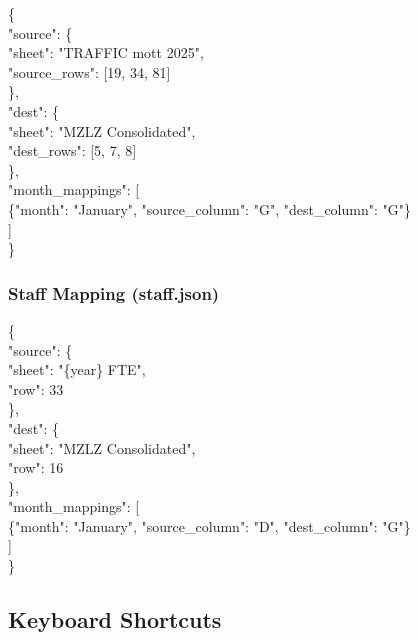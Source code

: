 \documentclass[11pt,a4paper]{article}
\begin{document}
\begin{codebox}
\{\\
\quad "source": \{\\
\quad\quad "sheet": "TRAFFIC mott 2025",\\
\quad\quad "source\_rows": [19, 34, 81]\\
\quad \},\\
\quad "dest": \{\\
\quad\quad "sheet": "MZLZ Consolidated",\\
\quad\quad "dest\_rows": [5, 7, 8]\\
\quad \},\\
\quad "month\_mappings": [\\
\quad\quad \{"month": "January", "source\_column": "G", "dest\_column": "G"\}\\
\quad ]\\
\}
\end{codebox}

\subsubsection{Staff Mapping (staff.json)}

\begin{codebox}
\{\\
\quad "source": \{\\
\quad\quad "sheet": "\{year\} FTE",\\
\quad\quad "row": 33\\
\quad \},\\
\quad "dest": \{\\
\quad\quad "sheet": "MZLZ Consolidated",\\
\quad\quad "row": 16\\
\quad \},\\
\quad "month\_mappings": [\\
\quad\quad \{"month": "January", "source\_column": "D", "dest\_column": "G"\}\\
\quad ]\\
\}
\end{codebox}

\subsection{Keyboard Shortcuts}
\end{document}
